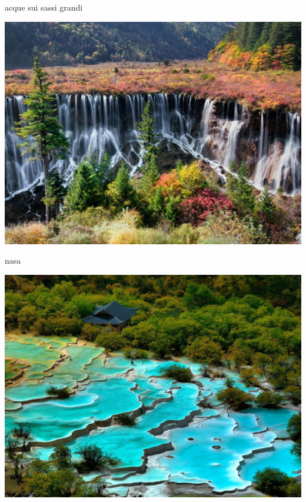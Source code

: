 \documentclass[presentation]{beamer}
\begin{document}
\begin{frame}[label={sec:orga6d5a18}]{acque sui sassi grandi}
\begin{center}
\includegraphics[width=.9\linewidth]{./immagini/cascata_lontana.jpg}
\end{center}
\end{frame}
\begin{frame}[label={sec:org803db3a}]{nasa}
\begin{center}
\includegraphics[width=.9\linewidth]{./immagini/marte_lontano.jpg}
\end{center}
\end{frame}
\end{document}
